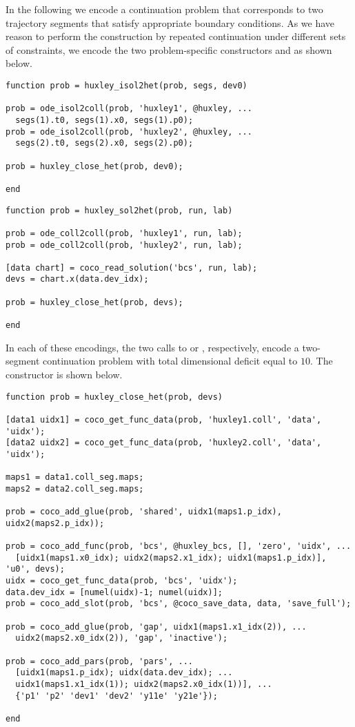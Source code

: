 In the following we encode a continuation problem that corresponds to two trajectory segments that satisfy appropriate boundary conditions. As we have reason to perform the construction by repeated continuation under different sets of constraints, we encode the two problem-specific constructors  and  as shown below.
\begin{lstlisting}[language=coco-highlight]
function prob = huxley_isol2het(prob, segs, dev0)

prob = ode_isol2coll(prob, 'huxley1', @huxley, ...
  segs(1).t0, segs(1).x0, segs(1).p0);
prob = ode_isol2coll(prob, 'huxley2', @huxley, ...
  segs(2).t0, segs(2).x0, segs(2).p0);

prob = huxley_close_het(prob, dev0);

end
\end{lstlisting}
\begin{lstlisting}[language=coco-highlight]
function prob = huxley_sol2het(prob, run, lab)

prob = ode_coll2coll(prob, 'huxley1', run, lab);
prob = ode_coll2coll(prob, 'huxley2', run, lab);

[data chart] = coco_read_solution('bcs', run, lab);
devs = chart.x(data.dev_idx);

prob = huxley_close_het(prob, devs);

end
\end{lstlisting}
In each of these encodings, the two calls to  or , respectively, encode a two-segment continuation problem with total dimensional deficit equal to $10$. The  constructor is shown below.
\begin{lstlisting}[language=coco-highlight]
function prob = huxley_close_het(prob, devs)

[data1 uidx1] = coco_get_func_data(prob, 'huxley1.coll', 'data', 'uidx');
[data2 uidx2] = coco_get_func_data(prob, 'huxley2.coll', 'data', 'uidx');

maps1 = data1.coll_seg.maps;
maps2 = data2.coll_seg.maps;

prob = coco_add_glue(prob, 'shared', uidx1(maps1.p_idx), uidx2(maps2.p_idx));

prob = coco_add_func(prob, 'bcs', @huxley_bcs, [], 'zero', 'uidx', ...
  [uidx1(maps1.x0_idx); uidx2(maps2.x1_idx); uidx1(maps1.p_idx)], 'u0', devs);
uidx = coco_get_func_data(prob, 'bcs', 'uidx');
data.dev_idx = [numel(uidx)-1; numel(uidx)];
prob = coco_add_slot(prob, 'bcs', @coco_save_data, data, 'save_full');

prob = coco_add_glue(prob, 'gap', uidx1(maps1.x1_idx(2)), ...
  uidx2(maps2.x0_idx(2)), 'gap', 'inactive');

prob = coco_add_pars(prob, 'pars', ...
  [uidx1(maps1.p_idx); uidx(data.dev_idx); ...
  uidx1(maps1.x1_idx(1)); uidx2(maps2.x0_idx(1))], ...
  {'p1' 'p2' 'dev1' 'dev2' 'y11e' 'y21e'});

end
\end{lstlisting}
